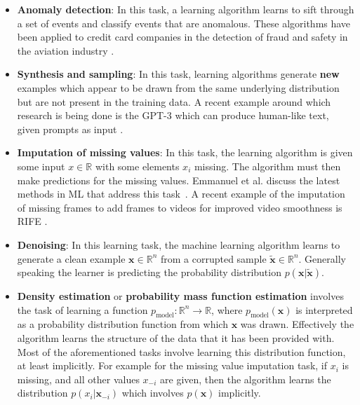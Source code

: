 \begin{itemize}
    \item \textbf{Anomaly detection}: In this task, a learning algorithm learns to sift through a set of events and classify events that are anomalous. These algorithms have been applied to credit card companies in the detection of fraud \cite{Tiwari2021} and safety in the aviation industry \cite{Janakiraman2016, Basora2019}.
    \item \textbf{Synthesis and sampling}: In this task, learning algorithms generate \textbf{new} examples which appear to be drawn from the same underlying distribution but are not present in the training data. A recent example around which research is being done is the \gls{GPT-3} which can produce human-like text, given prompts as input \cite{Brown2020}.
    \item \textbf{Imputation of missing values}: In this task, the learning algorithm is given some input $x\in\mathbb{R}$ with some elements $x_i$ missing. The algorithm must then make predictions for the missing values. Emmanuel et al. discuss the latest methods in \gls{ML} that address this task~\cite{Emmanuel2021}. A recent example of the imputation of missing frames to add frames to videos for improved video smoothness is \gls{RIFE} \cite{huang2020rife}.
    \item \textbf{Denoising}: In this learning task, the machine learning algorithm learns to generate a clean example $\mathbf{x}\in\mathbb{R}^n$ from a corrupted sample $\tilde{\mathbf{x}}\in\mathbb{R}^n$. Generally speaking the learner is predicting the probability distribution $p(\bm{x}|\tilde{\mathbf{x}})$.
    \item \textbf{Density estimation} or \textbf{probability mass function estimation} involves the task of learning a function $p_\text{model}:\mathbb{R}^n\rightarrow{}\mathbb{R}$, where $p_\text{model}(\mathbf{x})$ is interpreted as a probability distribution function from which $\mathbf{x}$ was drawn. Effectively the algorithm learns the structure of the data that it has been provided with. Most of the aforementioned tasks involve learning this distribution function, at least implicitly. For example for the missing value imputation task, if $x_i$ is missing, and all other values $x_{-i}$ are given, then the algorithm learns the distribution $p(x_i|\mathbf{x}_{-i})$ which involves $p(\mathbf{x})$ implicitly.
\end{itemize}

